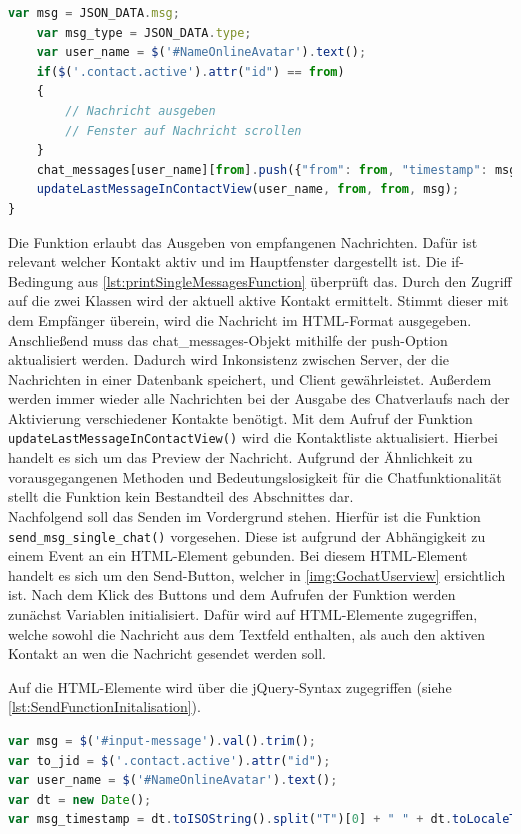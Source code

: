 \documentclass[a4paper,titlepage,halfparskip,12pt]{scrreprt}
\begin{document}
\begin{onehalfspacing}
\begin{lstlisting}[language=Javascript,caption=Funktion und Datenverarbeitung des JSON-Objektes ,label={lst:printSingleMessagesFunction}]
	var msg = JSON_DATA.msg;
	var msg_type = JSON_DATA.type;
	var user_name = $('#NameOnlineAvatar').text(); 
	if($('.contact.active').attr("id") == from) 
	{
		// Nachricht ausgeben
		// Fenster auf Nachricht scrollen
	}
	chat_messages[user_name][from].push({"from": from, "timestamp": msg_timestamp, "txt": msg, "type": "chat"});
	updateLastMessageInContactView(user_name, from, from, msg);
}
\end{lstlisting}
Die Funktion erlaubt das Ausgeben von empfangenen Nachrichten. Dafür ist relevant welcher Kontakt aktiv und im Hauptfenster dargestellt ist. Die if-Bedingung aus \autoref{lst:printSingleMessagesFunction} überprüft das. Durch den Zugriff auf die zwei Klassen wird der aktuell aktive Kontakt ermittelt. Stimmt dieser mit dem Empfänger überein, wird die Nachricht im HTML-Format ausgegeben. Anschließend muss das chat\_messages-Objekt mithilfe der push-Option aktualisiert werden. Dadurch wird Inkonsistenz zwischen Server, der die Nachrichten in einer Datenbank speichert, und Client gewährleistet. Außerdem werden immer wieder alle Nachrichten bei der Ausgabe des Chatverlaufs nach der Aktivierung verschiedener Kontakte benötigt. Mit dem Aufruf der Funktion \texttt{updateLastMessageInContactView()} wird die Kontaktliste aktualisiert. Hierbei handelt es sich um das Preview der Nachricht. Aufgrund der Ähnlichkeit zu vorausgegangenen Methoden und Bedeutungslosigkeit für die Chatfunktionalität stellt die Funktion kein Bestandteil des Abschnittes dar. \\
Nachfolgend soll das Senden im Vordergrund stehen. Hierfür ist die Funktion \texttt{send\_msg\_single\_chat()} vorgesehen. Diese ist aufgrund der Abhängigkeit zu einem Event an ein \ac{HTML}-Element gebunden. Bei diesem \ac{HTML}-Element handelt es sich um den \glqq Send\grqq-Button, welcher in \autoref{img:GochatUserview} ersichtlich ist. Nach dem Klick des Buttons und dem Aufrufen der Funktion werden zunächst Variablen initialisiert. Dafür wird auf \ac{HTML}-Elemente zugegriffen, welche sowohl die Nachricht aus dem Textfeld enthalten, als auch den aktiven Kontakt an wen die Nachricht gesendet werden soll.

Auf die \ac{HTML}-Elemente wird über die jQuery-Syntax zugegriffen (siehe \autoref{lst:SendFunctionInitalisation}).
\begin{lstlisting}[language=Javascript,caption=Initialisierung der Variablen zum Senden einer Nachricht ,label={lst:SendFunctionInitalisation}]
var msg = $('#input-message').val().trim();
var to_jid = $('.contact.active').attr("id");
var user_name = $('#NameOnlineAvatar').text();
var dt = new Date();
var msg_timestamp = dt.toISOString().split("T")[0] + " " + dt.toLocaleTimeString().substring(0,5); 
\end{lstlisting}


\end{onehalfspacing}
\end{document}
